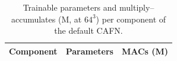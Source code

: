 \begin{table}[!t]
\caption{Trainable parameters and multiply--accumulates (M, at $64^3$) per component of the default CAFN.}
\label{tab:params}
\centering\footnotesize
\begin{tabular}{@{}lrr@{}}
\toprule
Component & Parameters & MACs (M)\\
\midrule

\bottomrule
\end{tabular}
\end{table}
